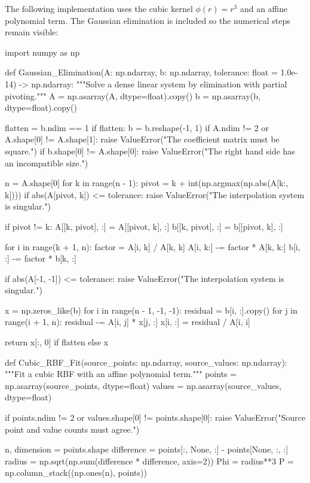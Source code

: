 The following implementation uses the cubic kernel $ \phi(r)=r^3 $ and an
affine polynomial term. The Gaussian elimination is included so the numerical
steps remain visible:

\begin{python}
import numpy as np


def Gaussian_Elimination(A: np.ndarray,
                         b: np.ndarray,
                         tolerance: float = 1.0e-14) -> np.ndarray:
    """Solve a dense linear system by elimination with partial pivoting."""
    A = np.asarray(A, dtype=float).copy()
    b = np.asarray(b, dtype=float).copy()

    flatten = b.ndim == 1
    if flatten:
        b = b.reshape(-1, 1)
    if A.ndim != 2 or A.shape[0] != A.shape[1]:
        raise ValueError("The coefficient matrix must be square.")
    if b.shape[0] != A.shape[0]:
        raise ValueError("The right hand side has an incompatible size.")

    n = A.shape[0]
    for k in range(n - 1):
        pivot = k + int(np.argmax(np.abs(A[k:, k])))
        if abs(A[pivot, k]) <= tolerance:
            raise ValueError("The interpolation system is singular.")

        if pivot != k:
            A[[k, pivot], :] = A[[pivot, k], :]
            b[[k, pivot], :] = b[[pivot, k], :]

        for i in range(k + 1, n):
            factor = A[i, k] / A[k, k]
            A[i, k:] -= factor * A[k, k:]
            b[i, :] -= factor * b[k, :]

    if abs(A[-1, -1]) <= tolerance:
        raise ValueError("The interpolation system is singular.")

    x = np.zeros_like(b)
    for i in range(n - 1, -1, -1):
        residual = b[i, :].copy()
        for j in range(i + 1, n):
            residual -= A[i, j] * x[j, :]
        x[i, :] = residual / A[i, i]

    return x[:, 0] if flatten else x


def Cubic_RBF_Fit(source_points: np.ndarray,
                  source_values: np.ndarray):
    """Fit a cubic RBF with an affine polynomial term."""
    points = np.asarray(source_points, dtype=float)
    values = np.asarray(source_values, dtype=float)

    if points.ndim != 2 or values.shape[0] != points.shape[0]:
        raise ValueError("Source point and value counts must agree.")

    n, dimension = points.shape
    difference = points[:, None, :] - points[None, :, :]
    radius = np.sqrt(np.sum(difference * difference, axis=2))
    Phi = radius**3
    P = np.column_stack((np.ones(n), points))


\end{python}
